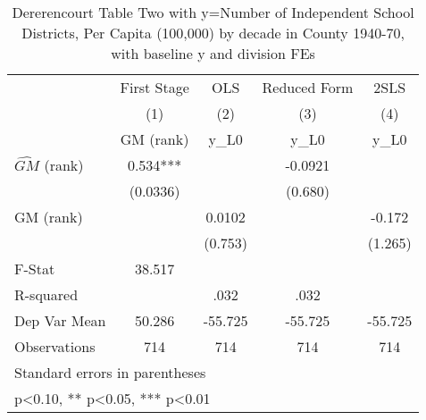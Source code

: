 \begin{table}[htbp]\centering
\def\sym#1{\ifmmode^{#1}\else\(^{#1}\)\fi}
\caption{Dererencourt Table Two with y=Number of Independent School Districts, Per Capita (100,000) by decade in County 1940-70, with baseline y and division FEs}
\begin{tabular}{l*{4}{c}}
\toprule
                    & First Stage   &         OLS   &Reduced Form   &        2SLS   \\
                    &\multicolumn{1}{c}{(1)}&\multicolumn{1}{c}{(2)}&\multicolumn{1}{c}{(3)}&\multicolumn{1}{c}{(4)}\\
                    &\multicolumn{1}{c}{GM  (rank)}&\multicolumn{1}{c}{y\_L0}&\multicolumn{1}{c}{y\_L0}&\multicolumn{1}{c}{y\_L0}\\
\midrule
$\hat{GM}$ (rank)   &       0.534***&               &     -0.0921   &               \\
                    &    (0.0336)   &               &     (0.680)   &               \\
\addlinespace
GM  (rank)          &               &      0.0102   &               &      -0.172   \\
                    &               &     (0.753)   &               &     (1.265)   \\
\midrule
F-Stat              &      38.517   &               &               &               \\
R-squared           &               &        .032   &        .032   &               \\
Dep Var Mean        &      50.286   &     -55.725   &     -55.725   &     -55.725   \\
Observations        &         714   &         714   &         714   &         714   \\
\bottomrule
\multicolumn{5}{l}{\footnotesize Standard errors in parentheses}\\
\multicolumn{5}{l}{\footnotesize * p<0.10, ** p<0.05, *** p<0.01}\\
\end{tabular}
\end{table}
